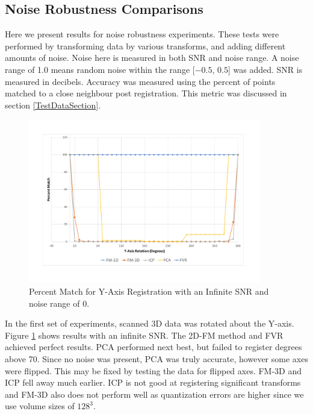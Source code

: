 
\subsection{Noise Robustness Comparisons}

Here we present results for noise robustness experiments. These tests were performed by transforming data by various transforms, and adding different amounts of noise. Noise here is measured in both SNR and noise range. A noise range of 1.0 means random noise within the range [$-0.5$, $0.5$] was added. SNR is measured in decibels. Accuracy was measured using the percent of points matched to a close neighbour post registration. This metric was discussed in section \ref{TestDataSection}. 

\begin{figure}[!htb]
\centering
\includegraphics[width=4.0in]{images/results/noise/YRNoise0}
\caption{Percent Match for Y-Axis Registration with an Infinite SNR and noise range of $0$.}
\label{fig:YRNoise0}
\end{figure}

In the first set of experiments, scanned 3D data was rotated about the Y-axis. Figure \ref{fig:YRNoise0} shows results with an infinite SNR. The 2D-FM method and FVR achieved perfect results. PCA performed next best, but failed to register degrees above 70. Since no noise was present, PCA was truly accurate, however some axes were flipped. This may be fixed by testing the data for flipped axes. FM-3D and ICP fell away much earlier. ICP is not good at registering significant transforms and FM-3D also does not perform well as quantization errors are higher since we use volume sizes of $128^3$.

